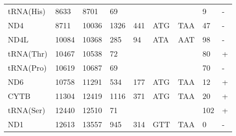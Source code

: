 \documentclass[../DISSERTACAO_MAIN.tex]{subfiles}
\begin{document}
\begin{longtable}{llllllllllllllllllllll}
			tRNA(His)    & 8633           & \multicolumn{2}{l}{8701}  & \multicolumn{2}{l}{69}         & \multicolumn{3}{l}{}                          & \multicolumn{3}{l}{}              & \multicolumn{3}{l}{}      & \multicolumn{3}{l}{9}           & \multicolumn{4}{l}{-}                  \\
			ND4          & 8711           & \multicolumn{2}{l}{10036} & \multicolumn{2}{l}{1326}       & \multicolumn{3}{l}{441}                       & \multicolumn{3}{l}{ATG}           & \multicolumn{3}{l}{TAA}   & \multicolumn{3}{l}{47}          & \multicolumn{4}{l}{-}                  \\
			ND4L         & 10084          & \multicolumn{2}{l}{10368} & \multicolumn{2}{l}{285}        & \multicolumn{3}{l}{94}                        & \multicolumn{3}{l}{ATA}           & \multicolumn{3}{l}{AAT}   & \multicolumn{3}{l}{98}          & \multicolumn{4}{l}{-}                  \\
			tRNA(Thr)    & 10467          & \multicolumn{2}{l}{10538} & \multicolumn{2}{l}{72}         & \multicolumn{3}{l}{}                          & \multicolumn{3}{l}{}              & \multicolumn{3}{l}{}      & \multicolumn{3}{l}{80}          & \multicolumn{4}{l}{+}                  \\
			tRNA(Pro)    & 10619          & \multicolumn{2}{l}{10687} & \multicolumn{2}{l}{69}         & \multicolumn{3}{l}{}                          & \multicolumn{3}{l}{}              & \multicolumn{3}{l}{}      & \multicolumn{3}{l}{70}          & \multicolumn{4}{l}{-}                  \\
			ND6          & 10758          & \multicolumn{2}{l}{11291} & \multicolumn{2}{l}{534}        & \multicolumn{3}{l}{177}                       & \multicolumn{3}{l}{ATG}           & \multicolumn{3}{l}{TAA}   & \multicolumn{3}{l}{12}          & \multicolumn{4}{l}{+}                  \\
			CYTB         & 11304          & \multicolumn{2}{l}{12419} & \multicolumn{2}{l}{1116}       & \multicolumn{3}{l}{371}                       & \multicolumn{3}{l}{ATG}           & \multicolumn{3}{l}{TAA}   & \multicolumn{3}{l}{20}          & \multicolumn{4}{l}{+}                  \\
			tRNA(Ser)    & 12440          & \multicolumn{2}{l}{12510} & \multicolumn{2}{l}{71}         & \multicolumn{3}{l}{}                          & \multicolumn{3}{l}{}              & \multicolumn{3}{l}{}      & \multicolumn{3}{l}{102}         & \multicolumn{4}{l}{+}                  \\
			ND1          & 12613          & \multicolumn{2}{l}{13557} & \multicolumn{2}{l}{945}        & \multicolumn{3}{l}{314}                       & \multicolumn{3}{l}{GTT}           & \multicolumn{3}{l}{TAA}   & \multicolumn{3}{l}{0}           & \multicolumn{4}{l}{-}                  \\

\end{longtable}
\end{document}

